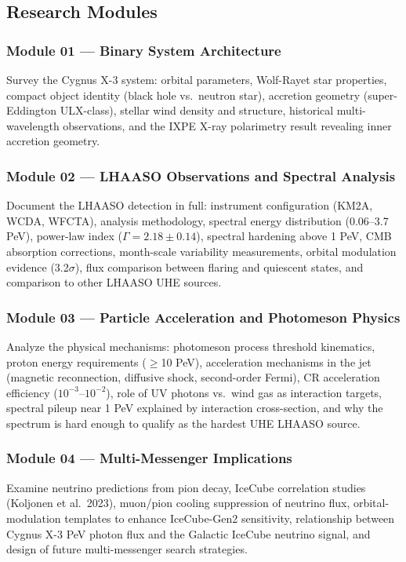 \documentclass[11pt,letterpaper]{article}
\begin{document}
\subsection{Research Modules}

\subsubsection{Module 01 --- Binary System Architecture}
Survey the Cygnus X-3 system: orbital parameters, Wolf-Rayet star properties, compact object identity (black hole vs.\ neutron star), accretion geometry (super-Eddington ULX-class), stellar wind density and structure, historical multi-wavelength observations, and the IXPE X-ray polarimetry result revealing inner accretion geometry.

\subsubsection{Module 02 --- LHAASO Observations and Spectral Analysis}
Document the LHAASO detection in full: instrument configuration (KM2A, WCDA, WFCTA), analysis methodology, spectral energy distribution (0.06--3.7 PeV), power-law index ($\Gamma = 2.18 \pm 0.14$), spectral hardening above 1 PeV, CMB absorption corrections, month-scale variability measurements, orbital modulation evidence (3.2$\sigma$), flux comparison between flaring and quiescent states, and comparison to other LHAASO UHE sources.

\subsubsection{Module 03 --- Particle Acceleration and Photomeson Physics}
Analyze the physical mechanisms: photomeson process threshold kinematics, proton energy requirements ($\geq$10 PeV), acceleration mechanisms in the jet (magnetic reconnection, diffusive shock, second-order Fermi), CR acceleration efficiency ($10^{-3}$--$10^{-2}$), role of UV photons vs.\ wind gas as interaction targets, spectral pileup near 1 PeV explained by interaction cross-section, and why the spectrum is hard enough to qualify as the hardest UHE LHAASO source.

\subsubsection{Module 04 --- Multi-Messenger Implications}
Examine neutrino predictions from pion decay, IceCube correlation studies (Koljonen et al.\ 2023), muon/pion cooling suppression of neutrino flux, orbital-modulation templates to enhance IceCube-Gen2 sensitivity, relationship between Cygnus X-3 PeV photon flux and the Galactic IceCube neutrino signal, and design of future multi-messenger search strategies.
\end{document}
